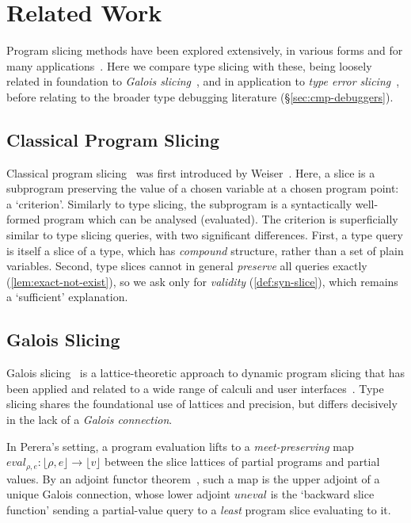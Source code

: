 \section{Related Work}
\label{sec:comparisons}
\label{sec:related-work}

Program slicing methods have been explored extensively, in various forms and for many applications~\cite{TipSurvey1995}. Here we compare type slicing with these, being loosely related in foundation to \emph{Galois slicing}~\cite{Perera2012}, and in application to \emph{type error slicing}~\cite{Wand1986,HaackWells2003}, before relating to the broader type debugging literature (\S\ref{sec:cmp-debuggers}).

\subsection{Classical Program Slicing}
\label{sec:cmp-program-slicing}

    Classical program slicing~\cite{TipSurvey1995} was first introduced by Weiser~\cite{Weiser1984}. Here, a slice is a subprogram preserving the value of a chosen variable at a chosen program point: a `criterion'. Similarly to type slicing, the subprogram is a syntactically well-formed program which can be analysed (evaluated).
The criterion is superficially similar to type slicing queries, with two significant differences. First, a type query is itself a slice of a type, which has \textit{compound} structure, rather than a set of plain variables. Second, type slices cannot in general \textit{preserve} all queries exactly (\cref{lem:exact-not-exist}), so we ask only for \textit{validity} (\cref{def:syn-slice}), which remains a `sufficient' explanation.

\subsection{Galois Slicing}
\label{sec:cmp-galois}

Galois slicing~\cite{Perera2012} is a lattice-theoretic approach to dynamic program slicing that has been applied and related to a wide range of calculi and user interfaces~\cite{Ricciotti2017,PereraGarg2016,PereraVis2022,AtkeyPerera2025}. Type slicing shares the foundational use of lattices and precision, but differs decisively in the lack of a \textit{Galois connection}. 

In Perera's setting, a program evaluation lifts to a \textit{meet-preserving} map $\mathit{eval}_{\rho,e} : \lfloor \rho, e\rfloor \to \lfloor v\rfloor$ between the slice lattices of partial programs and partial values. By an adjoint functor theorem~\cite[Prop.~7.34]{DaveyPriestley}, such a map is the upper adjoint of a unique Galois connection, whose lower adjoint $\mathit{uneval}$ is the `backward slice function' sending a partial-value query to a \textit{least} program slice evaluating to it.


